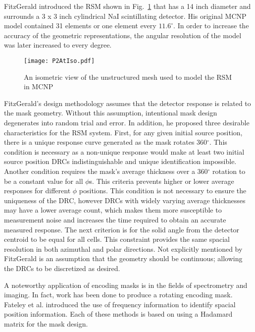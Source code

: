 \documentclass[3p,times]{elsarticle}
\begin{document}
FitzGerald\cite{FitzGerald2015} introduced the RSM shown in Fig.~\ref{fig:RSM} that has a 14 inch diameter and surrounds a 3 x 3 inch cylindrical NaI scintillating detector.  His original MCNP model contained 31 elements or one element every $11.6^\circ$.  In order to increase the accuracy of the geometric representations,  the angular resolution of the model was later increased to every degree.  

\begin{figure}[ht!]
\texttt{[image: P2AtIso.pdf]}
\centering
\caption{An isometric view of the unstructured mesh used to model the RSM in MCNP}
\label{fig:RSM}
\end{figure}

FitzGerald's design methodology assumes that the detector response is related to the mask geometry.  Without this assumption, intentional mask design degenerates into random trial and error.
In addition, he proposed three desirable characteristics for the RSM system.  
First, for any given initial source position, there is a unique response curve generated as the mask rotates 360$^\circ$.  This condition is necessary 
as a non-unique response would make at least two initial source position DRCs indistinguishable and unique identification impossible.
Another condition requires the mask's average thickness over a 360$^\circ$ 
rotation to be a constant value for all $\phi$s.  This criteria prevents higher or lower average responses for different $\phi$ positions.  This condition is not necessary to ensure 
the uniqueness of the DRC, however DRCs with widely varying average thicknesses may have a lower average count, which makes them more susceptible to measurement noise and increases
the time required to obtain an accurate measured response.
The next criterion is for the solid angle from the detector centroid to be equal for all cells.  This constraint provides the same spacial resolution in both azimuthal and polar directions.
Not explicitly mentioned by FitzGerald is an assumption that the geometry should be continuous; allowing the DRCs to be discretized as desired.

A noteworthy application of encoding masks is in the fields of spectrometry and imaging\cite{Sloane76,Finger85,Hanley00,DeVerse00}.  
In fact, work has been done to produce a rotating encoding mask\cite{Bellamy97}.
Fateley et al.\cite{Fateley00} introduced the use of frequency information to identify spacial position information.  Each of these methods is based on using a Hadamard matrix for the mask design.
\end{document}
